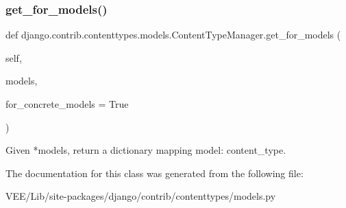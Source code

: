 \subsubsection{\texorpdfstring{get\+\_\+for\+\_\+models()}{get\_for\_models()}}
{\footnotesize\ttfamily def django.\+contrib.\+contenttypes.\+models.\+Content\+Type\+Manager.\+get\+\_\+for\+\_\+models (\begin{DoxyParamCaption}\item[{}]{self,  }\item[{}]{models,  }\item[{}]{for\+\_\+concrete\+\_\+models = {\ttfamily True} }\end{DoxyParamCaption})}

\begin{DoxyVerb}Given *models, return a dictionary mapping {model: content_type}.
\end{DoxyVerb}
 

The documentation for this class was generated from the following file\+:\begin{DoxyCompactItemize}
\item 
V\+E\+E/\+Lib/site-\/packages/django/contrib/contenttypes/models.\+py\end{DoxyCompactItemize}
